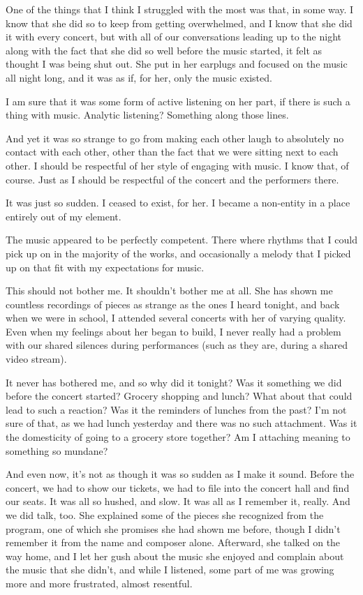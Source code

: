 One of the things that I think I struggled with the most was that, in some way. I know that she did so to keep from getting overwhelmed, and I know that she did it with every concert, but with all of our conversations leading up to the night along with the fact that she did so well before the music started, it felt as thought I was being shut out. She put in her earplugs and focused on the music all night long, and it was as if, for her, only the music existed.

I am sure that it was some form of active listening on her part, if there is such a thing with music. Analytic listening? Something along those lines.

And yet it was so strange to go from making each other laugh to absolutely no contact with each other, other than the fact that we were sitting next to each other. I should be respectful of her style of engaging with music. I know that, of course. Just as I should be respectful of the concert and the performers there.

It was just so sudden. I ceased to exist, for her. I became a non-entity in a place entirely out of my element.

The music appeared to be perfectly competent. There where rhythms that I could pick up on in the majority of the works, and occasionally a melody that I picked up on that fit with my expectations for music.

This should not bother me. It shouldn't bother me at all. She has shown me countless recordings of pieces as strange as the ones I heard tonight, and back when we were in school, I attended several concerts with her of varying quality. Even when my feelings about her began to build, I never really had a problem with our shared silences during performances (such as they are, during a shared video stream).

It never has bothered me, and so why did it tonight? Was it something we did before the concert started? Grocery shopping and lunch? What about that could lead to such a reaction? Was it the reminders of lunches from the past? I'm not sure of that, as we had lunch yesterday and there was no such attachment. Was it the domesticity of going to a grocery store together? Am I attaching meaning to something so mundane?

And even now, it's not as though it was so sudden as I make it sound. Before the concert, we had to show our tickets, we had to file into the concert hall and find our seats. It was all so hushed, and slow. It was all as I remember it, really. And we did talk, too. She explained some of the pieces she recognized from the program, one of which she promises she had shown me before, though I didn't remember it from the name and composer alone. Afterward, she talked on the way home, and I let her gush about the music she enjoyed and complain about the music that she didn't, and while I listened, some part of me was growing more and more frustrated, almost resentful.

